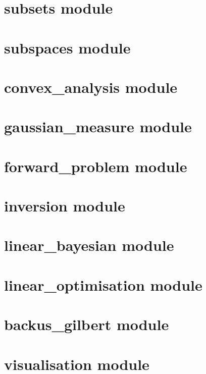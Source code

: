 \documentclass[11pt,twoside,openright]{book}
\theoremstyle{plain}
\theoremstyle{definition}
\theoremstyle{remark}
\begin{document}
\section{subsets module}
\label{sec:api-subsets}

\section{subspaces module}
\label{sec:api-subspaces}

\section{convex\_analysis module}
\label{sec:api-convex}

\section{gaussian\_measure module}
\label{sec:api-gaussian}

\section{forward\_problem module}
\label{sec:api-forward}

\section{inversion module}
\label{sec:api-inversion}

\section{linear\_bayesian module}
\label{sec:api-bayesian}

\section{linear\_optimisation module}
\label{sec:api-optimisation}

\section{backus\_gilbert module}
\label{sec:api-bg}

\section{visualisation module}
\label{sec:api-vis}


\backmatter




\end{document}

